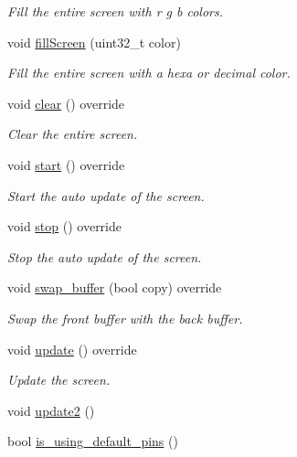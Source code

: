 \begin{DoxyCompactItemize}
\begin{DoxyCompactList}\small\item\em Fill the entire screen with r g b colors. \end{DoxyCompactList}\item 
void \hyperlink{classmatrix_a1a44a0f6011c61daa50391cda8d662d9}{fill\+Screen} (uint32\+\_\+t color)
\begin{DoxyCompactList}\small\item\em Fill the entire screen with a hexa or decimal color. \end{DoxyCompactList}\item 
void \hyperlink{classmatrix_af7e01d4f030990aba4e57af5085bd25c}{clear} () override
\begin{DoxyCompactList}\small\item\em Clear the entire screen. \end{DoxyCompactList}\item 
void \hyperlink{classmatrix_a191f64280f94a2fba62ad92edf6d038a}{start} () override
\begin{DoxyCompactList}\small\item\em Start the auto update of the screen. \end{DoxyCompactList}\item 
void \hyperlink{classmatrix_a3e791088f813e071a60dca840b6b3767}{stop} () override
\begin{DoxyCompactList}\small\item\em Stop the auto update of the screen. \end{DoxyCompactList}\item 
void \hyperlink{classmatrix_a371a4877409c2710021cfa3c226e63fb}{swap\+\_\+buffer} (bool copy) override
\begin{DoxyCompactList}\small\item\em Swap the front buffer with the back buffer. \end{DoxyCompactList}\item 
void \hyperlink{classmatrix_a55827c936f54e69487cc52b83a2311c3}{update} () override
\begin{DoxyCompactList}\small\item\em Update the screen. \end{DoxyCompactList}\item 
void \hyperlink{classmatrix_a32dade57d6aea1b4bb9aba2e5b4992ca}{update2} ()
\item 
bool \hyperlink{classmatrix_a94d0258f761e50a832b84bc12704c7eb}{is\+\_\+using\+\_\+default\+\_\+pins} ()
\end{DoxyCompactItemize}
